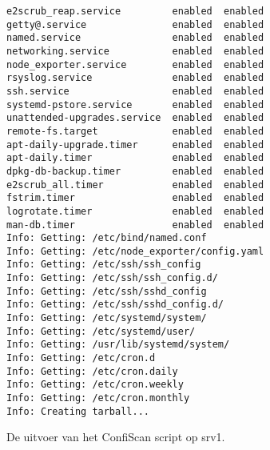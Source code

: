 \begin{longlisting}
\begin{verbatim}
e2scrub_reap.service         enabled  enabled
getty@.service               enabled  enabled
named.service                enabled  enabled
networking.service           enabled  enabled
node_exporter.service        enabled  enabled
rsyslog.service              enabled  enabled
ssh.service                  enabled  enabled
systemd-pstore.service       enabled  enabled
unattended-upgrades.service  enabled  enabled
remote-fs.target             enabled  enabled
apt-daily-upgrade.timer      enabled  enabled
apt-daily.timer              enabled  enabled
dpkg-db-backup.timer         enabled  enabled
e2scrub_all.timer            enabled  enabled
fstrim.timer                 enabled  enabled
logrotate.timer              enabled  enabled
man-db.timer                 enabled  enabled
Info: Getting: /etc/bind/named.conf
Info: Getting: /etc/node_exporter/config.yaml
Info: Getting: /etc/ssh/ssh_config
Info: Getting: /etc/ssh/ssh_config.d/
Info: Getting: /etc/ssh/sshd_config
Info: Getting: /etc/ssh/sshd_config.d/
Info: Getting: /etc/systemd/system/
Info: Getting: /etc/systemd/user/
Info: Getting: /usr/lib/systemd/system/
Info: Getting: /etc/cron.d
Info: Getting: /etc/cron.daily
Info: Getting: /etc/cron.weekly
Info: Getting: /etc/cron.monthly
Info: Creating tarball...
  \end{verbatim}
  \caption[Uitvoer van ConfiScan op \texttt{srv1}.]{De uitvoer van het ConfiScan script op srv1.}
  \label{lst:bijlage-confiscan}
\end{longlisting}
